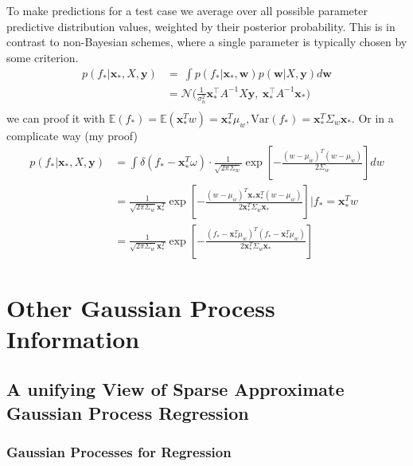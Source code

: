 \documentclass[10pt]{elegantbook}
\begin{document}
To make predictions for a test case we average over all possible parameter predictive distribution
values, weighted by their posterior probability. This is in contrast to non-Bayesian schemes, where a single parameter is typically chosen by some criterion. 
\begin{equation}
    \begin{aligned} 
        p ( f_{*} | \mathbf{x}_{*}, X, \mathbf{y} ) &=\ \int p ( f_{*} | \mathbf{x}_{*}, \mathbf{w} ) p ( \mathbf{w} | X, \mathbf{y} )  d \mathbf{w} \\ 
        &= \mathcal{N} \big ( \frac{1} {\sigma_{n}^{2}} \mathbf{x}_{*}^{\top} A^{-1} X \mathbf{y}, \ \mathbf{x}_{*}^{\top} A^{-1} \mathbf{x}_{*} \big ) \\ 
    \end{aligned} 
\end{equation}
we can proof it with $\mathbb{E}(f_*) = \mathbb E(\mathbf x_*^Tw) = \mathbf x_*^T\mu_w, \text{Var}(f_*) = \mathbf x_*^T \Sigma_w \mathbf x_*$. Or in a 
complicate way (my proof)
\begin{align*}
    p ( f_{*} | \mathbf{x}_{*}, X, \mathbf{y} )
    &=\int \delta(f_*-\mathbf x_*^T \omega)\cdot \frac{1}{\sqrt{2 \pi \Sigma_w}}\exp \left [ -\frac{(w-\mu_w)^T(w-\mu_w)}{2 \Sigma_w}\right ]dw \\
    &= \frac{1}{\sqrt{2 \pi \Sigma_w} \mathbf x_*^T}\exp \left [ -\frac{(w-\mu_w)^T\mathbf x_*\mathbf x_*^T(w-\mu_w)}{2 \mathbf x_*^T \Sigma_w  \mathbf x_*}\right ] | f_*=\mathbf x_*^T w \\
    &= \frac{1}{\sqrt{2 \pi \Sigma_w} \mathbf x_*^T}\exp \left [ -\frac{(f_*-\mathbf x_*^T\mu_w)^T(f_*-\mathbf x_*^T\mu_w)}{2 \mathbf x_*^T \Sigma_w  \mathbf x_*}\right ]
\end{align*}

\chapter{Other Gaussian Process Information}

\section{A unifying View of Sparse Approximate Gaussian Process Regression}

\subsection{Gaussian Processes for Regression}
\end{document}
